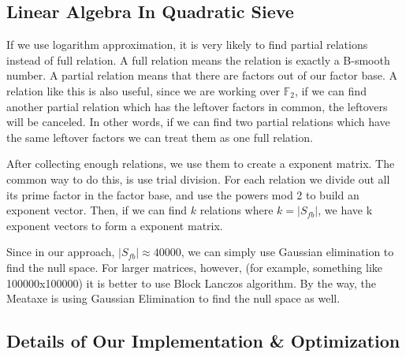 \documentclass[12pt]{article} %
\begin{document}
	\subsection {Linear Algebra In Quadratic Sieve}
	
	If we use logarithm approximation, it is very likely to find partial relations instead of full relation. A full relation means the relation is exactly a B-smooth number. A partial relation means that there are factors out of our factor base. A relation like this is also useful, since we are working over $\mathbb{F}_2$, if we can find another partial relation which has the leftover factors in common, the leftovers will be canceled. In other words, if we can find two partial relations which have the same leftover factors we can treat them as one full relation.
	
	After collecting enough relations, we use them to create a exponent matrix. The common way to do this, is use trial division. For each relation we divide out all its  prime factor in the factor base, and use the powers mod 2 to build an exponent vector. 
	Then, if we can find $k$ relations where $k = |S_{fb}|$, we have k exponent vectors to form a exponent matrix. 
	
	Since in our approach, $|S_{fb}|\approx 40000$, we can simply use Gaussian elimination to find the null space. For larger matrices, however, (for example, something like 100000x100000) it is better to use Block Lanczos algorithm. By the way, the Meataxe is using Gaussian Elimination to find the null space as well.
	
	\subsection {Details of Our Implementation \& Optimization}
	
\end{document}
